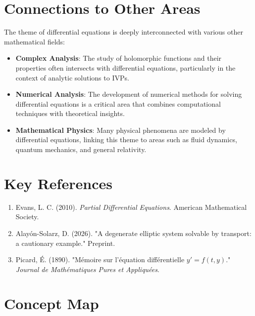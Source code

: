 \documentclass[11pt,a4paper]{article}
\begin{document}
\section{Connections to Other Areas}

The theme of differential equations is deeply interconnected with various other mathematical fields:

\begin{itemize}
\item \textbf{Complex Analysis}: The study of holomorphic functions and their properties often intersects with differential equations, particularly in the context of analytic solutions to IVPs.
\end{itemize}

\begin{itemize}
\item \textbf{Numerical Analysis}: The development of numerical methods for solving differential equations is a critical area that combines computational techniques with theoretical insights.
\end{itemize}

\begin{itemize}
\item \textbf{Mathematical Physics}: Many physical phenomena are modeled by differential equations, linking this theme to areas such as fluid dynamics, quantum mechanics, and general relativity.
\end{itemize}

\section{Key References}

\begin{enumerate}
\item Evans, L. C. (2010). \textit{Partial Differential Equations}. American Mathematical Society.
\item Alayón-Solarz, D. (2026). "A degenerate elliptic system solvable by transport: a cautionary example." Preprint.
\item Picard, É. (1890). "Mémoire sur l'équation différentielle \( y' = f(t, y) \)." \textit{Journal de Mathématiques Pures et Appliquées}.
\end{enumerate}

\section{Concept Map}
\end{document}
